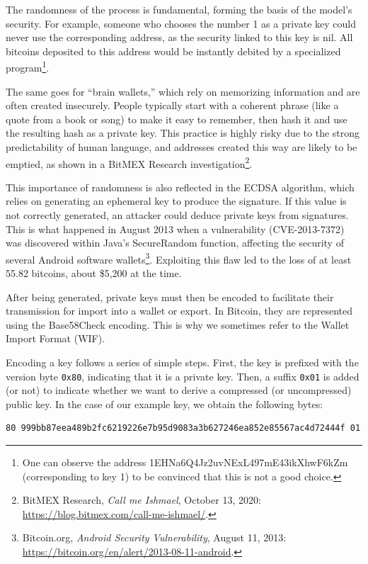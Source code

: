 \documentclass[
  a5paper,
  smalldemyvopaper,10pt,twoside,onecolumn,openright,extrafontsizes,hidelinks]{memoir}
\begin{document}
The randomness of the process is fundamental, forming the basis of the
model's security. For example, someone who chooses the number 1 as a
private key could never use the corresponding address, as the security
linked to this key is nil. All bitcoins deposited to this address would
be instantly debited by a specialized program\footnote{One can observe
  the address 1EHNa6Q4Jz2uvNExL497mE43ikXhwF6kZm (corresponding to key
  1) to be convinced that this is not a good choice.}.

The same goes for ``brain wallets,'' which rely on memorizing
information and are often created insecurely. People typically start
with a coherent phrase (like a quote from a book or song) to make it
easy to remember, then hash it and use the resulting hash as a private
key. This practice is highly risky due to the strong predictability of
human language, and addresses created this way are likely to be emptied,
as shown in a BitMEX Research investigation\footnote{BitMEX Research,
  \emph{Call me Ishmael}, October 13, 2020:
  \url{https://blog.bitmex.com/call-me-ishmael/}.}.

This importance of randomness is also reflected in the ECDSA algorithm,
which relies on generating an ephemeral key to produce the signature. If
this value is not correctly generated, an attacker could deduce private
keys from signatures. This is what happened in August 2013 when a
vulnerability (CVE-2013-7372) was discovered within Java's SecureRandom
function, affecting the security of several Android software
wallets\footnote{Bitcoin.org, \emph{Android Security Vulnerability},
  August 11, 2013:
  \url{https://bitcoin.org/en/alert/2013-08-11-android}.}. Exploiting
this flaw led to the loss of at least 55.82 bitcoins, about \$5,200 at
the time.

After being generated, private keys must then be encoded to facilitate
their transmission for import into a wallet or export. In Bitcoin, they
are represented using the Base58Check encoding. This is why we sometimes
refer to the Wallet Import Format (WIF).

Encoding a key follows a series of simple steps. First, the key is
prefixed with the version byte \texttt{0x80}, indicating that it is a
private key. Then, a suffix \texttt{0x01} is added (or not) to indicate
whether we want to derive a compressed (or uncompressed) public key. In
the case of our example key, we obtain the following bytes:

\begin{verbatim}
80 999bb87eea489b2fc6219226e7b95d9083a3b627246ea852e85567ac4d72444f 01
\end{verbatim}
\end{document}
